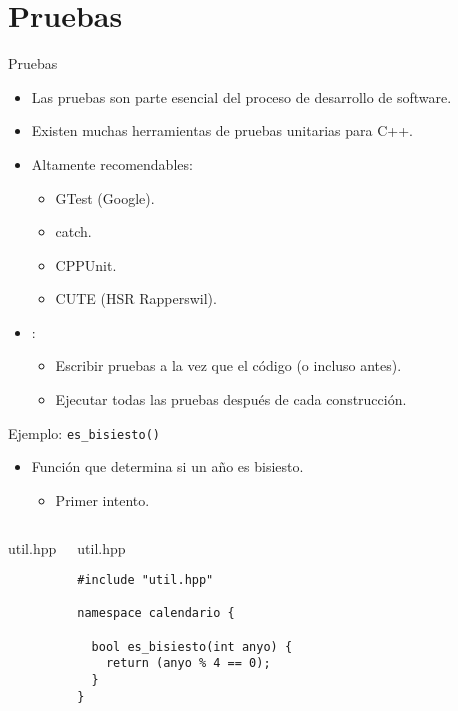 \section{Pruebas}

\begin{frame}[t]{Pruebas}
\begin{itemize}
  \item Las pruebas son parte esencial del proceso de desarrollo de software.
  \item Existen muchas herramientas de pruebas unitarias para C++.
  \item Altamente recomendables:
    \begin{itemize}
      \item GTest (Google).
      \item catch.
      \item CPPUnit.
      \item CUTE (HSR Rapperswil).
    \end{itemize}

  \item {}:
    \begin{itemize}
      \item Escribir pruebas a la vez que el código (o incluso antes).
      \item Ejecutar todas las pruebas después de cada construcción.
    \end{itemize}
\end{itemize}
\end{frame}

\begin{frame}[t,fragile]{Ejemplo: \texttt{es\_bisiesto()}}
\begin{itemize}
  \item Función que determina si un año es bisiesto.
    \begin{itemize}
      \item Primer intento.
    \end{itemize}
\end{itemize}

\begin{columns}[T]

\begin{block}{util.hpp}

\end{block}

\begin{block}{util.hpp}
\begin{lstlisting}
#include "util.hpp"

namespace calendario {

  bool es_bisiesto(int anyo) {
    return (anyo % 4 == 0);
  }
}
\end{lstlisting}
\end{block}


\end{columns}
\end{frame}

